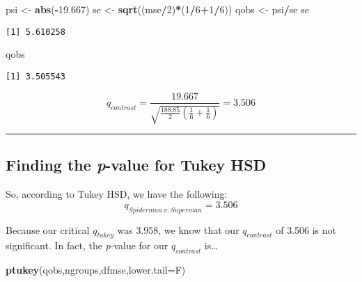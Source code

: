 \documentclass[]{article}
\newenvironment{Shaded}{\begin{snugshade}}{\end{snugshade}}
\newcommand{\DataTypeTok}[1]{\textcolor[rgb]{0.13,0.29,0.53}{#1}}
\newcommand{\DecValTok}[1]{\textcolor[rgb]{0.00,0.00,0.81}{#1}}
\newcommand{\FloatTok}[1]{\textcolor[rgb]{0.00,0.00,0.81}{#1}}
\newcommand{\KeywordTok}[1]{\textcolor[rgb]{0.13,0.29,0.53}{\textbf{#1}}}
\newcommand{\NormalTok}[1]{#1}
\newcommand{\OperatorTok}[1]{\textcolor[rgb]{0.81,0.36,0.00}{\textbf{#1}}}
\newcommand{\StringTok}[1]{\textcolor[rgb]{0.31,0.60,0.02}{#1}}
\begin{document}
\begin{Shaded}
\begin{Highlighting}[]
\NormalTok{psi <-}\StringTok{ }\KeywordTok{abs}\NormalTok{(}\OperatorTok{-}\FloatTok{19.667}\NormalTok{) }
\NormalTok{se <-}\StringTok{ }\KeywordTok{sqrt}\NormalTok{((mse}\OperatorTok{/}\DecValTok{2}\NormalTok{)}\OperatorTok{*}\NormalTok{(}\DecValTok{1}\OperatorTok{/}\DecValTok{6}\OperatorTok{+}\DecValTok{1}\OperatorTok{/}\DecValTok{6}\NormalTok{))}
\NormalTok{qobs <-}\StringTok{ }\NormalTok{psi}\OperatorTok{/}\NormalTok{se}
\NormalTok{se}
\end{Highlighting}
\end{Shaded}

\begin{verbatim}
[1] 5.610258
\end{verbatim}

\begin{Shaded}
\begin{Highlighting}[]
\NormalTok{qobs}
\end{Highlighting}
\end{Shaded}

\begin{verbatim}
[1] 3.505543
\end{verbatim}

\[q_{contrast}=\frac{19.667}{\sqrt{\frac{188.85}{2}({\frac{1}{6}+\frac{1}{6}})}}=3.506\]

\begin{center}\rule{0.5\linewidth}{\linethickness}\end{center}

\hypertarget{finding-the-p-value-for-tukey-hsd}{%
\subsection{\texorpdfstring{Finding the \emph{p}-value for Tukey
HSD}{Finding the p-value for Tukey HSD}}\label{finding-the-p-value-for-tukey-hsd}}

So, according to Tukey HSD, we have the following:
\[q_{Spiderman\:v.\:Superman}=3.506\]

Because our critical \(q_{tukey}\) was 3.958, we know that our
\(q_{contrast}\) of 3.506 is not significant. In fact, the
\emph{p}-value for our \(q_{contrast}\) is\ldots{}

\begin{Shaded}
\begin{Highlighting}[]
\KeywordTok{ptukey}\NormalTok{(qobs,ngroups,dfmse,}\DataTypeTok{lower.tail=}\NormalTok{F)}
\end{Highlighting}
\end{Shaded}
\end{document}
